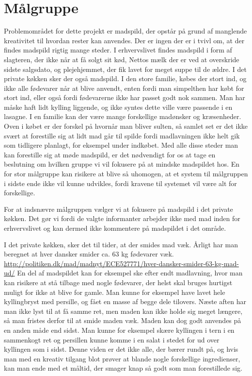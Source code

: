 \section {Målgruppe}
Problemområdet for dette projekt er madspild, der opstår på grund af manglende kreativitet til hvordan rester kan anvendes. Der er ingen der er i tvivl om, at der findes madspild rigtig mange steder. I erhvervslivet findes madspild i form af slagteren, der ikke når at få solgt sit kød, Nettos mælk der er ved at overskride sidste salgsdato, og plejehjemmet, der fik lavet for meget suppe til de ældre. I det private køkken sker der også madspild. I den store familie, købes der stort ind, og ikke alle fødevarer når at blive anvendt, enten fordi man simpelthen har købt for stort ind, eller også fordi fødevarerne ikke har passet godt nok sammen. Man har måske haft lidt kylling liggende, og ikke syntes dette ville være passende i en lasagne. I en familie kan der være mange forskellige madønsker og kræsenheder. Oven i købet er der forskel på hvornår man bliver sulten, så samlet set er det ikke svært at forestille sig at lidt mad går til spilde fordi madlavningen ikke helt gik som tidligere planlagt, for eksempel under indkøbet.
Med alle disse steder man kan forestille sig at møde madspild, er det nødvendigt for os at tage en beslutning om hvilken gruppe vi vil fokusere på at mindske madspildet hos. En for stor målgruppe kan risikere at blive så uhomogen, at et system til målgruppen i sidste ende ikke vil kunne udvikles, fordi kravene til systemet vil være alt for forskellige.

For at indsnævre målgruppen vælger vi at fokusere på madspild i det private køkken. Det gør vi fordi de valgte informanter arbejder ikke med mad inden for erhvervslivet og kan dermed ikke kommentere på madspildet i det område.

I det private køkken, sker det til tider, at der smides mad væk. Årligt har man beregnet at hver dansker smider ca. 63 kg fødevarer væk. \url{http://politiken.dk/mad/madnyt/ECE527771/hver-dansker-smider-63-kg-mad-ud/} 
En del af madspildet kan for eksempel ske efter endt madlavning, hvor man kan risikere at stå tilbage med nogle fødevarer, der helst skal bruges hurtigst muligt for ikke at blive for gamle. Man kunne for eksempel have lavet hele kyllingbryst med persille, og fået en masse af begge dele tilovers. Næste aften har man ikke lyst til at få samme ret, men maden kan ikke holde sig meget længere, så man fristes derfor til at smide maden væk. Maden kan dog godt anvendes på en anden måde end sidst. Man kunne for eksempel skære kyllingen i tern i en sammenkogt ret og persillen kunne komme i en salat i stedet for ud over kyllingen som i sidst. Denne viden er det ikke alle, der bærer rundt på, og hvis man med en kreativ tilgang blot prøver at blande nogle forskellige ingredienser, kan man ende med et måltid, der smager knap så godt som man forestillede sig.
